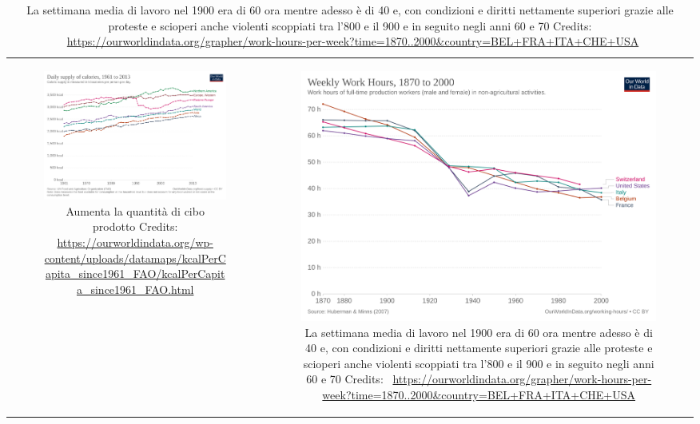 \documentclass[12pt]{book} %
\begin{document}
\begin{table}[H]
\centering
\begin{tabular}{cc}
  \begin{subfigure}{0.5\textwidth}
    \centering
    \includegraphics[width=0.8\linewidth]{images/Libro-img010.png}
    \caption{Aumenta la quantità di cibo prodotto
Credits: \protect\url{https://ourworldindata.org/wp-content/uploads/datamaps/kcalPerCapita\_since1961\_FAO/kcalPerCapita\_since1961\_FAO.html}}
  \end{subfigure}
  &
  \begin{subfigure}{0.5\textwidth}
    \centering
    \includegraphics[width=0.8\linewidth]{images/Libro-img011.png}
    \caption{La settimana media di lavoro nel 1900 era di 60 ora mentre adesso è di 40 e, con condizioni e diritti nettamente
superiori grazie alle proteste e scioperi anche violenti scoppiati tra l'800 e il 900 e in seguito
negli anni 60 e 70
Credits: \ \protect\url{https://ourworldindata.org/grapher/work-hours-per-week?time=1870..2000\&country=BEL+FRA+ITA+CHE+USA}}
  \end{subfigure}
\end{tabular}
\end{table}
\end{document}
